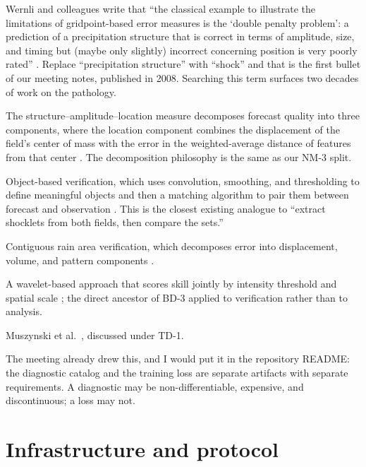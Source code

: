 \documentclass[11pt]{article}
\begin{document}
\begin{description}[leftmargin=*,style=nextline]
\item[The double penalty problem, stated in the literature.] Wernli and colleagues write
that ``the classical example to illustrate the limitations of gridpoint-based error measures
is the `double penalty problem': a prediction of a precipitation structure that is correct in
terms of amplitude, size, and timing but (maybe only slightly) incorrect concerning position
is very poorly rated'' \cite{wernli2008}. Replace ``precipitation structure'' with ``shock''
and that is the first bullet of our meeting notes, published in 2008. Searching this term
surfaces two decades of work on the pathology.
\item[SAL.] The structure--amplitude--location measure decomposes forecast quality into three
components, where the location component combines the displacement of the field's center of
mass with the error in the weighted-average distance of features from that center
\cite{wernli2008}. The decomposition philosophy is the same as our NM-3 split.
\item[MODE.] Object-based verification, which uses convolution, smoothing, and thresholding
to define meaningful objects and then a matching algorithm to pair them between forecast and
observation \cite{davis2006a,davis2006b,davis2009}. This is the closest existing analogue to
``extract shocklets from both fields, then compare the sets.''
\item[CRA.] Contiguous rain area verification, which decomposes error into displacement,
volume, and pattern components \cite{ebertmcbride2000}.
\item[Intensity-scale verification.] A wavelet-based approach that scores skill jointly by
intensity threshold and spatial scale \cite{casati2004}; the direct ancestor of BD-3 applied
to verification rather than to analysis.
\item[Threshold-free topological detection.] Muszynski et al.\ \cite{muszynski2019},
discussed under TD-1.
\item[The strategic lesson.] The meeting already drew this, and I would put it in the
repository README: the diagnostic catalog and the training loss are separate artifacts with
separate requirements. A diagnostic may be non-differentiable, expensive, and discontinuous;
a loss may not.
\end{description}

\section{Infrastructure and protocol}
\end{document}
